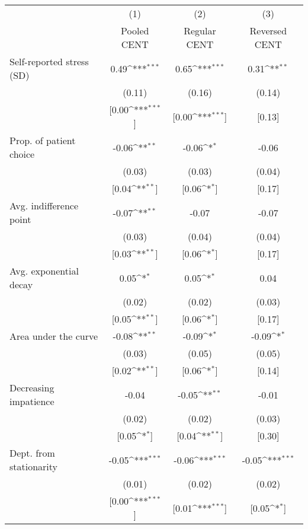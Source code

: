 {
\def\sym#1{\ifmmode^{#1}\else\(^{#1}\)\fi}
\begin{tabular}{l*{3}{c}}
\toprule
          &\multicolumn{1}{c}{(1)}&\multicolumn{1}{c}{(2)}&\multicolumn{1}{c}{(3)}\\
          &\multicolumn{1}{c}{Pooled CENT}&\multicolumn{1}{c}{Regular CENT}&\multicolumn{1}{c}{Reversed CENT}\\
\midrule
Self-reported stress (SD)&0.49\sym{***}&0.65\sym{***}&0.31\sym{**}\\
          &   (0.11)&   (0.16)&   (0.14)\\
          &[0.00\sym{***}]&[0.00\sym{***}]&   [0.13]\\
Prop. of patient choice&-0.06\sym{**}&-0.06\sym{*}&    -0.06\\
          &   (0.03)&   (0.03)&   (0.04)\\
          &[0.04\sym{**}]&[0.06\sym{*}]&   [0.17]\\
Avg. indifference point&-0.07\sym{**}&    -0.07&    -0.07\\
          &   (0.03)&   (0.04)&   (0.04)\\
          &[0.03\sym{**}]&[0.06\sym{*}]&   [0.17]\\
Avg. exponential decay&0.05\sym{*}&0.05\sym{*}&     0.04\\
          &   (0.02)&   (0.02)&   (0.03)\\
          &[0.05\sym{**}]&[0.06\sym{*}]&   [0.17]\\
Area under the curve&-0.08\sym{**}&-0.09\sym{*}&-0.09\sym{*}\\
          &   (0.03)&   (0.05)&   (0.05)\\
          &[0.02\sym{**}]&[0.06\sym{*}]&   [0.14]\\
Decreasing impatience&    -0.04&-0.05\sym{**}&    -0.01\\
          &   (0.02)&   (0.02)&   (0.03)\\
          &[0.05\sym{*}]&[0.04\sym{**}]&   [0.30]\\
Dept. from stationarity&-0.05\sym{***}&-0.06\sym{***}&-0.05\sym{***}\\
          &   (0.01)&   (0.02)&   (0.02)\\
          &[0.00\sym{***}]&[0.01\sym{***}]&[0.05\sym{*}]\\
\bottomrule
\end{tabular}
}
